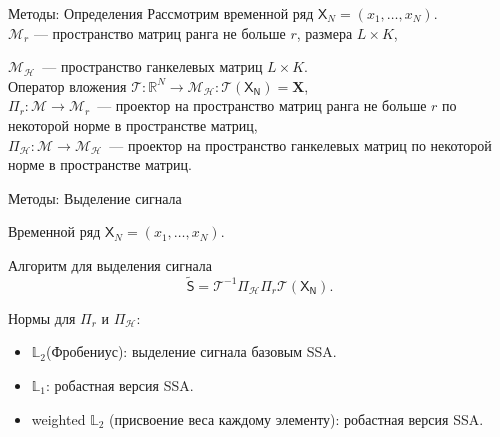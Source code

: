 \documentclass[ucs, notheorems, handout]{beamer}
\newcommand{\tX}[1]{\mathsf{#1}}
\begin{document}
\begin{frame}{Методы: Определения}
Рассмотрим временной ряд $\tX{X}_N=(x_1, \ldots, x_{N})$.\\
\vspace{1em}
$\mathcal{M}_{r}$ --- пространство матриц ранга не больше $r$, размера $L \times K$,

$\mathcal{M}_{\mathcal{H}}$~--- пространство ганкелевых матриц $L\times K$.\\
\vspace{1em}
Оператор вложения $\mathcal{T}:\mathbb{R}^N \rightarrow \mathcal{M}_{\mathcal{H}}: \mathcal{T} (\tX{X_N}) = \mathbf{X} $,\\
\vspace{1em}
$\Pi_{r}:\mathcal{M}\rightarrow \mathcal{M}_r$~--- проектор на пространство матриц ранга не больше $r$ по некоторой норме в пространстве матриц,\\
\vspace{1em}
$\Pi_{\mathcal{H}}:\mathcal{M} \rightarrow \mathcal{M}_{\mathcal{H}}$~--- проектор на пространство ганкелевых матриц по некоторой норме в пространстве матриц.

    \note{}

\end{frame}

\begin{frame}{Методы: Выделение сигнала}

Временной ряд $\tX{X}_N=(x_1, \ldots, x_{N})$.
\begin{block}{Алгоритм для выделения сигнала}
\begin{equation*}
	\tilde{\tX{S}} = \mathcal{T}^{-1} \Pi_{\mathcal{H}} \Pi_{r} \mathcal{T} (\tX{X_N}).
\end{equation*}
\end{block}


Нормы для $\Pi_r$ и $\Pi_{\mathcal{H}}$:
\begin{itemize}
        \item $\mathbb{L}_2$(Фробениус): выделение сигнала базовым SSA.
        \item $\mathbb{L}_1$: робастная версия SSA.
        \item weighted $\mathbb{L}_2$ (присвоение веса каждому элементу): робастная версия SSA.
\end{itemize}
    \note{}
\end{frame}
\end{document}
